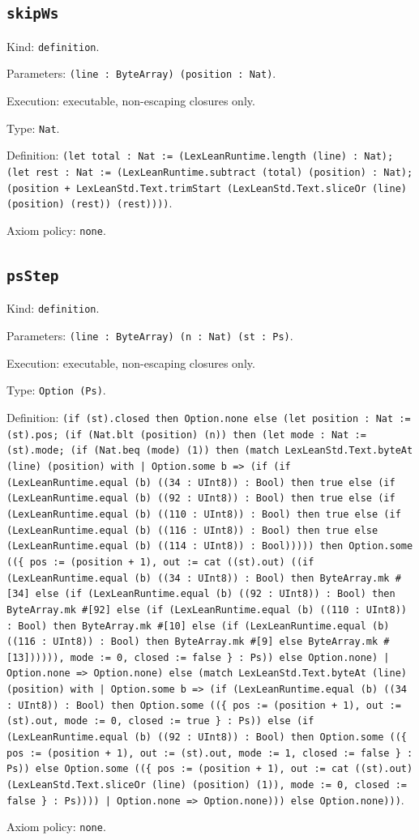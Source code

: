 \documentclass[11pt]{article}
\begin{document}
\subsection*{\texttt{skipWs}}
\noindent Kind: \texttt{definition}.\par
\noindent Parameters: \texttt{(line : ByteArray) (position : Nat)}.\par
\noindent Execution: executable, non-escaping closures only.\par
\noindent Type: \texttt{Nat}.\par
\noindent Definition: \texttt{(let total : Nat := (LexLeanRuntime.length (line) : Nat); (let rest : Nat := (LexLeanRuntime.subtract (total) (position) : Nat); (position + LexLeanStd.Text.trimStart (LexLeanStd.Text.sliceOr (line) (position) (rest)) (rest))))}.\par
\noindent Axiom policy: \texttt{none}.\par
\subsection*{\texttt{psStep}}
\noindent Kind: \texttt{definition}.\par
\noindent Parameters: \texttt{(line : ByteArray) (n : Nat) (st : Ps)}.\par
\noindent Execution: executable, non-escaping closures only.\par
\noindent Type: \texttt{Option (Ps)}.\par
\noindent Definition: \texttt{(if (st).closed then Option.none else (let position : Nat := (st).pos; (if (Nat.blt (position) (n)) then (let mode : Nat := (st).mode; (if (Nat.beq (mode) (1)) then (match LexLeanStd.Text.byteAt (line) (position) with | Option.some b => (if (if (LexLeanRuntime.equal (b) ((34 : UInt8)) : Bool) then true else (if (LexLeanRuntime.equal (b) ((92 : UInt8)) : Bool) then true else (if (LexLeanRuntime.equal (b) ((110 : UInt8)) : Bool) then true else (if (LexLeanRuntime.equal (b) ((116 : UInt8)) : Bool) then true else (LexLeanRuntime.equal (b) ((114 : UInt8)) : Bool))))) then Option.some ((\{ pos := (position + 1), out := cat ((st).out) ((if (LexLeanRuntime.equal (b) ((34 : UInt8)) : Bool) then ByteArray.mk \#[34] else (if (LexLeanRuntime.equal (b) ((92 : UInt8)) : Bool) then ByteArray.mk \#[92] else (if (LexLeanRuntime.equal (b) ((110 : UInt8)) : Bool) then ByteArray.mk \#[10] else (if (LexLeanRuntime.equal (b) ((116 : UInt8)) : Bool) then ByteArray.mk \#[9] else ByteArray.mk \#[13]))))), mode := 0, closed := false \} : Ps)) else Option.none) | Option.none => Option.none) else (match LexLeanStd.Text.byteAt (line) (position) with | Option.some b => (if (LexLeanRuntime.equal (b) ((34 : UInt8)) : Bool) then Option.some ((\{ pos := (position + 1), out := (st).out, mode := 0, closed := true \} : Ps)) else (if (LexLeanRuntime.equal (b) ((92 : UInt8)) : Bool) then Option.some ((\{ pos := (position + 1), out := (st).out, mode := 1, closed := false \} : Ps)) else Option.some ((\{ pos := (position + 1), out := cat ((st).out) (LexLeanStd.Text.sliceOr (line) (position) (1)), mode := 0, closed := false \} : Ps)))) | Option.none => Option.none))) else Option.none)))}.\par
\noindent Axiom policy: \texttt{none}.\par
\end{document}
